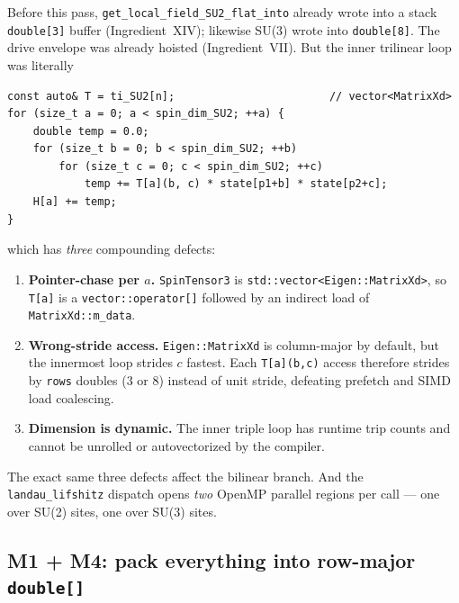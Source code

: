 \documentclass[11pt,letterpaper]{article}
\begin{document}
Before this pass, \texttt{get\_local\_field\_SU2\_flat\_into} already
wrote into a stack \texttt{double[3]} buffer (Ingredient~XIV);
likewise SU(3) wrote into \texttt{double[8]}.  The drive envelope was
already hoisted (Ingredient~VII).  But the inner trilinear loop was
literally
\begin{verbatim}
const auto& T = ti_SU2[n];                        // vector<MatrixXd>
for (size_t a = 0; a < spin_dim_SU2; ++a) {
    double temp = 0.0;
    for (size_t b = 0; b < spin_dim_SU2; ++b)
        for (size_t c = 0; c < spin_dim_SU2; ++c)
            temp += T[a](b, c) * state[p1+b] * state[p2+c];
    H[a] += temp;
}
\end{verbatim}
which has \emph{three} compounding defects:
\begin{enumerate}[noitemsep]
  \item \textbf{Pointer-chase per $a$.}  \texttt{SpinTensor3} is
        \texttt{std::vector<Eigen::MatrixXd>}, so \texttt{T[a]} is a
        \texttt{vector::operator[]} followed by an indirect load of
        \texttt{MatrixXd::m\_data}.
  \item \textbf{Wrong-stride access.}  \texttt{Eigen::MatrixXd} is
        column-major by default, but the innermost loop strides $c$
        fastest.  Each \texttt{T[a](b,c)} access therefore strides by
        \texttt{rows} doubles ($3$ or $8$) instead of unit stride,
        defeating prefetch and SIMD load coalescing.
  \item \textbf{Dimension is dynamic.}  The inner triple loop has
        runtime trip counts and cannot be unrolled or autovectorized
        by the compiler.
\end{enumerate}
The exact same three defects affect the bilinear branch.  And the
\texttt{landau\_lifshitz} dispatch opens \emph{two} OpenMP parallel
regions per call --- one over SU(2) sites, one over SU(3) sites.

\subsection{M1 + M4: pack everything into row-major \texttt{double[]}}
\end{document}
